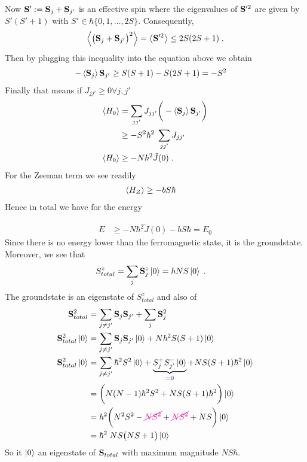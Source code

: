 Now $\mathbf S' :=\mathbf S_{j} + \mathbf S_{j'}$ is an effective spin where the eigenvalues of
$\mathbf S'^{2}$ are given by $S'(S'+1)$ with $S'\in \hbar \{0,1,\ldots,2 S\}$.
Consequently,
%
\begin{align*}
\left\langle\big( \mathbf S_{j} + \mathbf S_{j'} \big)^{2}\right\rangle  = \left\langle\mathbf S'^2\right\rangle \le 2S(2S+1)\;.
\end{align*}
%
Then by plugging this inequality into the equation above we obtain
%
\begin{align*}
- \left\langle\mathbf S_{j}\right\rangle \mathbf S_{j'} &\ge S(S+1) - S(2S+1) = - S^{2}
\end{align*}
%
Finally that means if $J_{jj'}\ge 0 \forall j,j'$
%
\begin{align*}
\left\langle H_{0}\right\rangle &= \sum_{jj'} J_{jj'} \bigg(-\left\langle\mathbf S_{j}\right\rangle \mathbf S_{j'}\bigg) \\
&\ge -S^{2}\hbar^{2}\;\sum_{jj'} J_{jj'}\\
\left\langle H_{0}\right\rangle &\ge - N \hbar^{2} \tilde J(0)\;.
\end{align*}
%
For the Zeeman term we see readily
%
\begin{align*}
\left\langle H_{Z}\right\rangle &\ge  - b S\hbar 
\end{align*}
%
Hence in total we have for the energy

%
\begin{align*}
E &\ge - N \hbar^{2} \tilde J(0) - b S\hbar = E_{0}
\end{align*}
%
Since there is no energy lower than the ferromagnetic state, it is the groundstate.
Moreover, we see that 
%
\begin{align*}
S^{z}_{total} &=\sum_{j} \mathbf S_{j}^{z}\ket{0} = \hbar NS \ket{0}\;.
\end{align*}
%
The groundstate is an eigenstate of $S^{z}_{total}$ and also of
%
\begin{align*}
\mathbf S_{total}^{2} &=\sum_{j\ne j'} \mathbf S_{j} \mathbf S_{j'} + \sum_{j} \mathbf S_{j}^{2}\\
\mathbf S_{total}^{2}\ket{0} &=\sum_{j\ne j'} \mathbf S_{j} \mathbf S_{j'} \ket{0} + N 
\hbar^{2}S(S+1)\ket{0}\\
\mathbf S_{total}^{2}\ket{0} &=\sum_{j\ne j'} \hbar^{2}S^{2} \ket{0} + \underbrace{
S_{j}^{+} S_{j'}^{-} \ket{0}
}_{\color{blue} = 0} + NS(S+1)\hbar^{2} \ket{0}\\
&=\bigg( N(N-1)\hbar^{2} S^{2} +  NS(S+1)\hbar^{2}\bigg)\ket{0}\\
&=\hbar^{2}\bigg( N^{2} S^{2} - {\color{magenta} \cancel{N  S^{2}}} +  {\color{magenta} \cancel{N S^{2}}} + NS \bigg)\ket{0}\\
&=\hbar^{2}\; N S\big(NS+1  \big) \ket{0}
\end{align*}
%
So it $\ket{0}$ an eigenstate of $\mathbf S_{total}$ with maximum magnitude $NS\hbar$.

